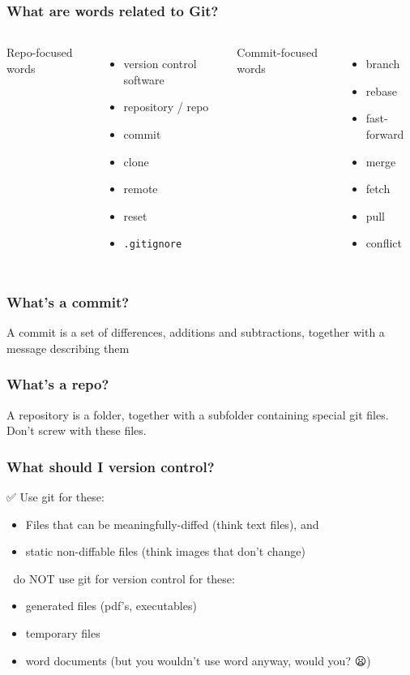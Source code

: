 \documentclass[14pt,aspectratio=1610]{beamer} %
\newcommand{\fframe}[2]{
   \begin{frame}
\frametitle{#1}
#2
\end{frame}
}
\begin{document}
\fframe{What are words related to Git?}
{
	\begin{columns}[t]
	\column{2in}
	Repo-focused words
	\begin{itemize}
		\item version control software
		\item repository / repo
		\item commit
		\item clone
		\item remote
		\item reset
		\item {\tt .gitignore}


		
	\end{itemize}

	\column{2in}
	Commit-focused words
	\begin{itemize}		
		\item branch
		\item rebase
		\item fast-forward
		\item merge
		\item fetch
		\item pull
		\item conflict
	\end{itemize}
	\end{columns}
}





\fframe{What's a commit?}{
A commit is a set of differences, additions and subtractions, together with a message describing them
}

\fframe{What's a repo?}
{  
A repository is a folder, together with a subfolder containing special git files.  Don't screw with these files.
}
                    
\fframe{What should I version control?}
{
	✅ Use git for these: 
	\begin{itemize}
		\item Files that can be meaningfully-diffed (think text files), and 
		\item static non-diffable files (think images that don't change)
	\end{itemize}

\vspace{\baselineskip}

	🚫 do NOT use git for version control for these:
	\begin{itemize}
		\item generated files (pdf's, executables)
		\item temporary files
		\item word documents (but you wouldn't use word anyway, would you? 😦)
	\end{itemize}
}
\end{document}
